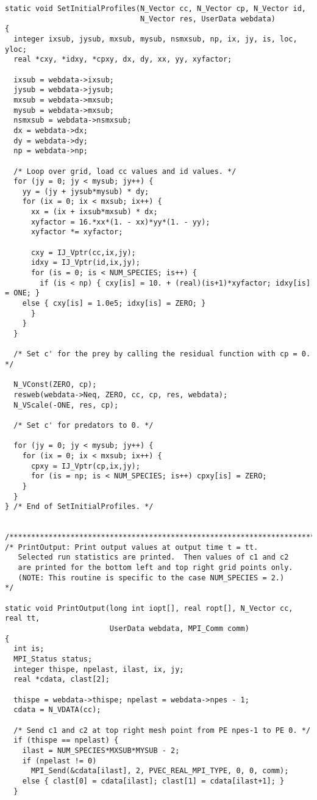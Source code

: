 \documentclass[11pt]{article}
\begin{document}
\begin{verbatim}
static void SetInitialProfiles(N_Vector cc, N_Vector cp, N_Vector id,
                               N_Vector res, UserData webdata)
{
  integer ixsub, jysub, mxsub, mysub, nsmxsub, np, ix, jy, is, loc, yloc;
  real *cxy, *idxy, *cpxy, dx, dy, xx, yy, xyfactor;

  ixsub = webdata->ixsub;
  jysub = webdata->jysub;
  mxsub = webdata->mxsub;
  mysub = webdata->mxsub;
  nsmxsub = webdata->nsmxsub;
  dx = webdata->dx;
  dy = webdata->dy;
  np = webdata->np;

  /* Loop over grid, load cc values and id values. */
  for (jy = 0; jy < mysub; jy++) {
    yy = (jy + jysub*mysub) * dy;
    for (ix = 0; ix < mxsub; ix++) {
      xx = (ix + ixsub*mxsub) * dx;
      xyfactor = 16.*xx*(1. - xx)*yy*(1. - yy);
      xyfactor *= xyfactor;

      cxy = IJ_Vptr(cc,ix,jy); 
      idxy = IJ_Vptr(id,ix,jy); 
      for (is = 0; is < NUM_SPECIES; is++) {
        if (is < np) { cxy[is] = 10. + (real)(is+1)*xyfactor; idxy[is] = ONE; }
    else { cxy[is] = 1.0e5; idxy[is] = ZERO; }
      }
    }
  }

  /* Set c' for the prey by calling the residual function with cp = 0. */

  N_VConst(ZERO, cp);
  resweb(webdata->Neq, ZERO, cc, cp, res, webdata);
  N_VScale(-ONE, res, cp);

  /* Set c' for predators to 0. */

  for (jy = 0; jy < mysub; jy++) {
    for (ix = 0; ix < mxsub; ix++) {
      cpxy = IJ_Vptr(cp,ix,jy); 
      for (is = np; is < NUM_SPECIES; is++) cpxy[is] = ZERO;
    }
  }
} /* End of SetInitialProfiles. */


/*************************************************************************/
/* PrintOutput: Print output values at output time t = tt.
   Selected run statistics are printed.  Then values of c1 and c2
   are printed for the bottom left and top right grid points only.
   (NOTE: This routine is specific to the case NUM_SPECIES = 2.)         */

static void PrintOutput(long int iopt[], real ropt[], N_Vector cc, real tt,
                        UserData webdata, MPI_Comm comm)
{
  int is;
  MPI_Status status;
  integer thispe, npelast, ilast, ix, jy;
  real *cdata, clast[2];

  thispe = webdata->thispe; npelast = webdata->npes - 1;
  cdata = N_VDATA(cc);

  /* Send c1 and c2 at top right mesh point from PE npes-1 to PE 0. */
  if (thispe == npelast) {
    ilast = NUM_SPECIES*MXSUB*MYSUB - 2;
    if (npelast != 0)
      MPI_Send(&cdata[ilast], 2, PVEC_REAL_MPI_TYPE, 0, 0, comm);
    else { clast[0] = cdata[ilast]; clast[1] = cdata[ilast+1]; }
  }


\end{verbatim}
\end{document}
